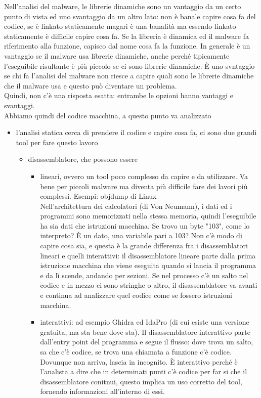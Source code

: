 \documentclass[12pt, oneside]{extbook}
\begin{document}
Nell'analisi del malware, le librerie dinamiche sono un vantaggio da un certo punto di vista ed uno svantaggio da un altro lato: non è banale capire cosa fa del codice, se è linkato staticamente magari è una banalità ma essendo linkato staticamente è difficile capire cosa fa. Se la libreria è dinamica ed il malware fa riferimento alla funzione, capisco dal nome cosa fa la funzione. In generale è un vantaggio se il malware usa librerie dinamiche, anche perché tipicamente l'eseguibile risultante è più piccolo se ci sono librerie dinamiche. È uno svntaggio se chi fa l'analisi del malware non riesce a capire quali sono le librerie dinamiche che il malware usa e questo può diventare un problema.\\ Quindi, non c'è una risposta esatta: entrambe le opzioni hanno vantaggi e svantaggi.\\ Abbiamo quindi del codice macchina, a questo punto va analizzato
\begin{itemize}
\item l'analisi statica cerca di prendere il codice e capire cosa fa, ci sono due grandi tool per fare questo lavoro
\begin{itemize}
\item disassemblatore, che possono essere
\begin{itemize}
\item lineari, ovvero un tool poco complesso da capire e da utilizzare. Va bene per piccoli malware ma diventa più difficile fare dei lavori più complessi. Esempi: objdump di Linux\\ Nell'architettura dei calcolatori (di Von Neumann), i dati ed i programmi sono memorizzati nella stessa memoria, quindi l'eseguibile ha sia dati che istruzioni macchina. Se trovo un byte "103", come lo interpreto? È un dato, una variabile pari a 103? Non c'è modo di capire cosa sia, e questa è la grande differenza fra i disassemblatori lineari e quelli interattivi: il disassemblatore lineare parte dalla prima istruzione macchina che viene eseguita quando si lancia il programma e da lì scende, andando per sezioni. Se nel processo c'è un salto nel codice e in mezzo ci sono stringhe o altro, il disassemblatore va avanti e continua ad analizzare quel codice come se fossero istruzioni macchina.
\item interattivi: ad esempio Ghidra ed IdaPro (di cui esiste una versione gratuita, ma sta bene dove sta). Il disassemblatore interattivo parte dall'entry point del programma e segue il flusso: dove trova un salto, sa che c'è codice, se trova una chiamata a funzione c'è codice. Dovunque non arriva, lascia in incognito. È interattivo perché è l'analista a dire che in determinati punti c'è codice per far si che il disassemblatore conitnui, questo implica un uso corretto del tool, fornendo informazioni all'interno di essi.
\end{itemize}
\end{itemize}
\end{itemize}
\end{document}
